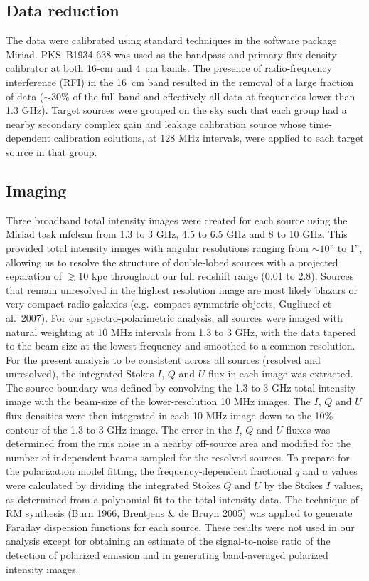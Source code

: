 \documentclass{mnras}
\begin{document}
\subsection{Data reduction} \label{reduction}
The data were calibrated using standard techniques in the software package {\sc Miriad}. PKS~B1934-638 was used as the bandpass and primary flux density calibrator at both 16-cm and 4~cm bands. The presence of radio-frequency interference (RFI) in the 16~cm band resulted in the removal of a large fraction of data ($\sim$30\% of the full band and effectively all data at frequencies lower than 1.3 GHz). Target sources were grouped on the sky such that each group had a nearby secondary complex gain and leakage calibration source whose time-dependent calibration solutions, at 128 MHz intervals, were applied to each target source in that group. 

\subsection{Imaging} \label{imaging}
Three broadband total intensity images were created for each source using the {\sc Miriad} task {\sc mfclean} from 1.3 to 3 GHz, 4.5 to 6.5 GHz and 8 to 10 GHz. This provided total intensity images with angular resolutions ranging from $\sim10$'' to 1'', allowing us to resolve the structure of double-lobed sources with a projected separation of $\gtrsim10$ kpc throughout our full redshift range (0.01 to 2.8). Sources that remain unresolved in the highest resolution image are most likely blazars or very compact radio galaxies (e.g.~compact symmetric objects, Gugliucci et al.~2007). 
For our spectro-polarimetric analysis, all sources were imaged with natural weighting at 10 MHz intervals from 1.3 to 3 GHz, with the data tapered to the beam-size at the lowest frequency and smoothed to a common resolution. For the present analysis to be consistent across all sources (resolved and unresolved), the integrated Stokes $I$, $Q$ and $U$ flux in each image was extracted. The source boundary was defined by convolving the 1.3 to 3 GHz total intensity image with the beam-size of the lower-resolution 10 MHz images. The $I$, $Q$ and $U$ flux densities were then integrated in each 10 MHz image down to the 10\% contour of the 1.3 to 3 GHz image. The error in the $I$, $Q$ and $U$ fluxes was determined from the rms noise in a nearby off-source area and modified for the number of independent beams sampled for the resolved sources. To prepare for the polarization model fitting, the frequency-dependent fractional $q$ and $u$ values were calculated by dividing the integrated Stokes $Q$ and $U$ by the Stokes $I$ values, as determined from a polynomial fit to the total intensity data. 
The technique of RM synthesis (Burn 1966, Brentjens \& de Bruyn 2005) was applied to generate Faraday dispersion functions for each source. These results were not used in our analysis except for obtaining an estimate of the signal-to-noise ratio of the detection of polarized emission %
and in generating band-averaged polarized intensity images. %
\end{document}
